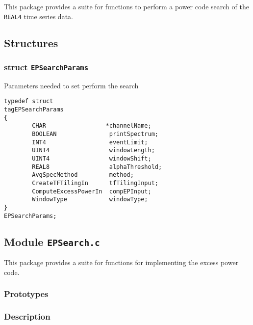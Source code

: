 \noindent This package provides a suite for functions to perform a
power code search of the \texttt{REAL4} time series data.

\subsection*{Structures}

\subsubsection*{struct \texttt{EPSearchParams}}

\noindent Parameters needed to set perform the search

\begin{verbatim}
typedef struct
tagEPSearchParams
{
        CHAR                 *channelName;
        BOOLEAN               printSpectrum;
        INT4                  eventLimit;
        UINT4                 windowLength;
        UINT4                 windowShift;
        REAL8                 alphaThreshold;
        AvgSpecMethod         method;
        CreateTFTilingIn      tfTilingInput;
        ComputeExcessPowerIn  compEPInput;
        WindowType            windowType;
}
EPSearchParams;
\end{verbatim}

\newpage
\subsection{Module \texttt{EPSearch.c}}
\label{ss:EPSearch.c}

This package provides a suite for functions for implementing the
excess power code. 

\subsubsection*{Prototypes}
\vspace{0.1in}



\subsubsection*{Description}

